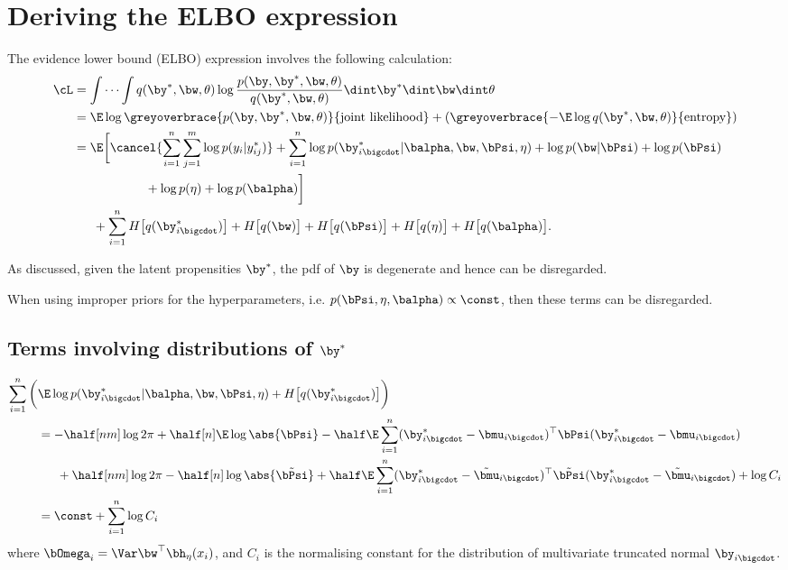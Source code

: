\section{Deriving the ELBO expression}

The evidence lower bound (ELBO) expression involves the following calculation:
\begin{align*}
  \cL &= \idotsint q(\by^*,\bw,\theta) 
  \log \frac{p(\by,\by^*,\bw,\theta)}{q(\by^*,\bw,\theta)}
  \dint\by^* \dint\bw \dint\theta \\
  &= \E \log \greyoverbrace{p(\by,\by^*,\bw,\theta)}{\text{joint likelihood}}
  +
  (\greyoverbrace{-\E \log q(\by^*,\bw,\theta)}{\text{entropy}}) \\
  &= \E\bigg[
  \cancel{\sum_{i=1}^n \sum_{j=1}^m \log  p(y_{i}|y_{ij}^*)} + 
  \sum_{i=1}^n \log  p(\by_{i \bigcdot}^*|\balpha,\bw,\bPsi,\eta) +
  \log p(\bw|\bPsi) +
  \log p(\bPsi) \\ 
  &\hspace{2cm} +
  \log p(\eta) +
  \log p(\balpha)
  \bigg] \\
  &\phantom{==} 
  + \sum_{i=1}^n H\big[q(\by^*_{i \bigcdot}) \big]
  + H\big[q(\bw) \big]
  + H\big[q(\bPsi) \big]
  + H\big[q(\eta) \big]
  + H\big[q(\balpha) \big].
\end{align*}

\begin{remark}
  As discussed, given the latent propensities $\by^*$, the pdf of $\by$ is degenerate and hence can be disregarded.  
\end{remark}

\begin{remark}
  When using improper priors for the hyperparameters, i.e. $p(\bPsi,\eta,\balpha) \propto \const$, then these terms can be disregarded.  
\end{remark}

\subsection{Terms involving distributions of \texorpdfstring{$\by^*$}{$y^*$}}

\begin{align*}
  \sum_{i=1}^n  \bigg( &
  \E  \log p(\by_{i \bigcdot}^*|\balpha,\bw,\bPsi,\eta) 
  + H \big[q(\by^*_{i \bigcdot}) \big] 
  \bigg) \\
  &=  -\half[nm]\log 2\pi + \half[n]\E \log \abs{\bPsi} - \half \E \sum_{i=1}^n (\by^*_{i \bigcdot} - \bmu_{i \bigcdot})^\top \bPsi (\by^*_{i \bigcdot} - \bmu_{i \bigcdot}) \\
  &\phantom{==} +\half[nm]\log 2\pi - \half[n] \log \abs{\tilde\bPsi} + \half \E \sum_{i=1}^n (\by^*_{i \bigcdot} - \tilde\bmu_{i \bigcdot})^\top \tilde\bPsi (\by^*_{i \bigcdot} - \tilde\bmu_{i \bigcdot}) + \log C_i  \\
   &=\const + \sum_{i=1}^n \log C_i 
\end{align*}
where $\bOmega_i = \Var \bw^\top\bh_\eta(x_i)$, and $C_i$ is the normalising constant for the distribution of multivariate truncated normal $\by_{i \bigcdot}$.

